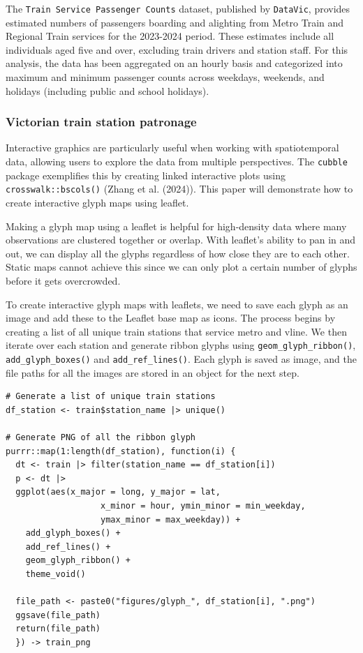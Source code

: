 The \texttt{Train\ Service\ Passenger\ Counts} dataset, published by \texttt{DataVic}, provides estimated numbers of passengers boarding and alighting from Metro Train and Regional Train services for the 2023-2024 period. These estimates include all individuals aged five and over, excluding train drivers and station staff. For this analysis, the data has been aggregated on an hourly basis and categorized into maximum and minimum passenger counts across weekdays, weekends, and holidays (including public and school holidays).

\hypertarget{victorian-train-station-patronage}{%
\subsubsection{Victorian train station patronage}\label{victorian-train-station-patronage}}

Interactive graphics are particularly useful when working with spatiotemporal data, allowing users to explore the data from multiple perspectives. The \texttt{cubble} package exemplifies this by creating linked interactive plots using \texttt{crosswalk::bscols()} (Zhang et al. (2024)). This paper will demonstrate how to create interactive glyph maps using leaflet.

Making a glyph map using a leaflet is helpful for high-density data where many observations are clustered together or overlap. With leaflet's ability to pan in and out, we can display all the glyphs regardless of how close they are to each other. Static maps cannot achieve this since we can only plot a certain number of glyphs before it gets overcrowded.

To create interactive glyph maps with leaflets, we need to save each glyph as an image and add these to the Leaflet base map as icons. The process begins by creating a list of all unique train stations that service metro and vline. We then iterate over each station and generate ribbon glyphs using \texttt{geom\_glyph\_ribbon()}, \texttt{add\_glyph\_boxes()} and \texttt{add\_ref\_lines()}. Each glyph is saved as image, and the file paths for all the images are stored in an object for the next step.

\begin{verbatim}
# Generate a list of unique train stations
df_station <- train$station_name |> unique()

# Generate PNG of all the ribbon glyph
purrr::map(1:length(df_station), function(i) {
  dt <- train |> filter(station_name == df_station[i])
  p <- dt |>
  ggplot(aes(x_major = long, y_major = lat,
                   x_minor = hour, ymin_minor = min_weekday,
                   ymax_minor = max_weekday)) +
    add_glyph_boxes() +
    add_ref_lines() +
    geom_glyph_ribbon() +
    theme_void() 
  
  file_path <- paste0("figures/glyph_", df_station[i], ".png")
  ggsave(file_path)
  return(file_path)
  }) -> train_png 
\end{verbatim}


